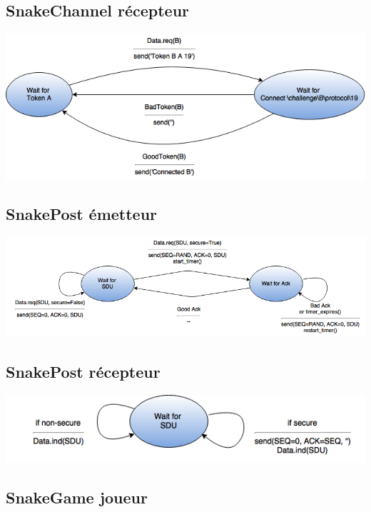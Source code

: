 \documentclass[a4paper]{article}
\begin{document}
\subsection{SnakeChannel récepteur}
\begin{center}
\includegraphics[scale=0.7]{sc_recepteur.png}
\end{center}
\newpage
\subsection{SnakePost émetteur}
\begin{center}
\includegraphics[scale=0.6]{sp_emetteur.png}
\end{center}
\subsection{SnakePost récepteur}
\begin{center}
\includegraphics[scale=0.7]{sp_recepteur.png}
\end{center}
\subsection{SnakeGame joueur}
\end{document}
